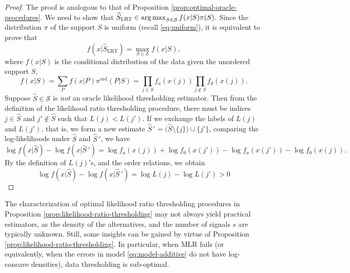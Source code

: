 \begin{proof}%
The proof is analogous to that of Proposition \ref{prop:optimal-oracle-procedures}.
We need to show that
$
\widehat{S}_{\rm LRT} \in \operatorname*{arg\,max}_{S \in \mathcal{S}} f(x|S) \pi(S).
$
Since the distribution $\pi$ of the support $S$ 
is uniform (recall \eqref{eq:uniform}), it is equivalent to prove that 
$$
f(x|\widehat{S}_{\text{LRT}}) = \max_{S \in \mathcal {S}} f(x|S),
$$ 
where  $f(x|S)$ is the conditional distribution of the data given the unordered support $S$,
\begin{equation} \label{eq:likelihood-ratio-thresholding-proof}
    f(x|S) = \sum_P f(x|P) \pi^{\text{ord}}(P|S) = \prod_{j\in S} f_a(x(j)) \prod_{j\not\in S}{f_0(x(j))}.
\end{equation}
Suppose $\widehat S\in {\mathcal S}$ is {\em not} an oracle likelihood thresholding estimator. 
Then from the definition of the likelihood ratio thresholding procedure, there 
must be indices 
$j \in \widehat S$ and $j' \not \in \widehat{S}$ such that $L(j) < L(j')$.
If we exchange the labels of $L(j)$ and $L(j')$, that is, we form a new estimate 
$\widehat{S}\,' = \big(\widehat{S}\setminus\{j\}\big)\cup\{j'\}$,
comparing the log-likelihoods under $\widehat{S}$ and $\widehat{S}\,'$, we have
\begin{equation*}
    \log{f(x|\widehat{S})} - \log{f(x|\widehat{S}\,')} 
    = \log{f_a(x(j))} + \log{f_0(x(j'))} - \log{f_a(x(j'))} - \log{f_0(x(j))}.
\end{equation*}
By the definition of $L(j)$'s, and the order relations, we obtain
\begin{equation*}
    \log{f(x|\widehat{S})} - \log{f(x|\widehat{S}\,')} 
    = \log{L(j)} - \log{L(j')} > 0
\end{equation*}
\end{proof}


The characterization of optimal likelihood ratio thresholding procedures in Proposition \ref{prop:likelihood-ratio-thresholding} may not always yield practical estimators, as the density of the alternatives, and the number of signals $s$ 
are typically unknown. Still, some insights can be gained by virtue of Proposition \ref{prop:likelihood-ratio-thresholding}.
In particular, when MLR fails (or equivalently, when the errors in model \eqref{eq:model-additive} do not have log-concave densities), data thresholding is sub-optimal. 


